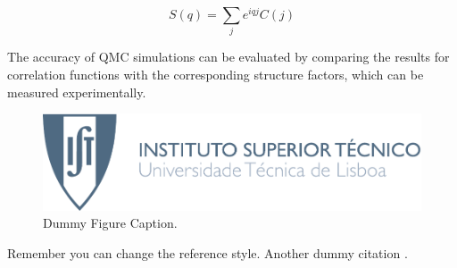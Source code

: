 \begin{equation}
S(q) = \sum_j e^{iqj} C(j) 
\end{equation}

The accuracy of QMC simulations can be evaluated by comparing the results for correlation functions with the corresponding structure factors, which can be measured experimentally.

\begin{figure}[H]
	\centering
		\includegraphics[width=0.5\linewidth]{Figures/2.HubbardModel/dummy.pdf}
	\caption[Dummy Figure Caption for List of Figures.]{Dummy Figure Caption.}
	\label{fig:dummyfigure1}
\end{figure}

Remember you can change the reference style. Another dummy citation \cite{site}.
